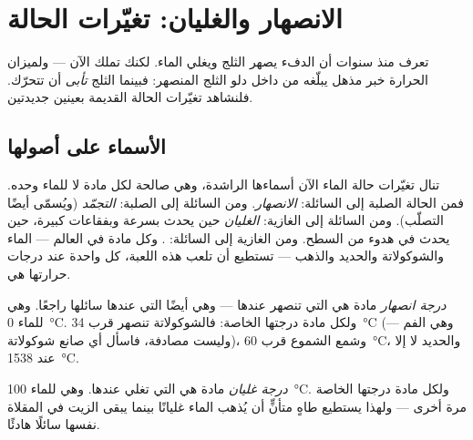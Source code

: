 \chapter{الانصهار والغليان: تغيّرات الحالة}\label{ch:g4:changes-of-state}

تعرف منذ سنوات أن الدفء يصهر الثلج ويغلي الماء. لكنك تملك الآن
 --- ولميزان الحرارة خبر مذهل يبلّغه من داخل دلو الثلج
المنصهر: فبينما  الثلج \emph{تأبى}  أن تتحرّك.
فلنشاهد تغيّرات الحالة القديمة بعينين جديدتين.

\section{الأسماء على أصولها}

تنال تغيّرات حالة الماء الآن أسماءها الراشدة، وهي صالحة لكل مادة
لا للماء وحده. فمن الحالة الصلبة إلى السائلة:
\emph{الانصهار}. ومن السائلة إلى الصلبة:
\emph{التجمّد} (ويُسمّى أيضًا التصلّب). ومن السائلة
إلى الغازية: \emph{الغليان} حين يحدث بسرعة وبفقاعات
كبيرة،  حين يحدث في هدوء من السطح. ومن الغازية إلى
السائلة: . وكل مادة في العالم --- الماء والشوكولاتة
والحديد والذهب --- تستطيع أن تلعب هذه اللعبة، كل واحدة عند درجات
حرارتها هي.

\begin{definition}\label{def:g4:changes-of-state:melting-point}
\emph{درجة انصهار} مادة هي  التي
تنصهر عندها --- وهي أيضًا  التي  عندها سائلها
راجعًا. وهي للماء \qty{0}{\celsius}. ولكل مادة درجتها الخاصة:
فالشوكولاتة تنصهر قرب \qty{34}{\celsius} (وهي  الفم ---
وليست مصادفة، فاسأل أي صانع شوكولاتة)، وشمع الشموع قرب
\qty{60}{\celsius}، والحديد لا  إلا عند \qty{1538}{\celsius}.
\end{definition}

\begin{definition}\label{def:g4:changes-of-state:boiling-point}
\emph{درجة غليان} مادة هي  التي
تغلي عندها. وهي للماء \qty{100}{\celsius}. ولكل مادة درجتها
الخاصة مرة أخرى --- ولهذا يستطيع طاهٍ متأنٍّ أن يُذهب الماء
غليانًا بينما يبقى الزيت في المقلاة نفسها سائلًا هادئًا.
\end{definition}

